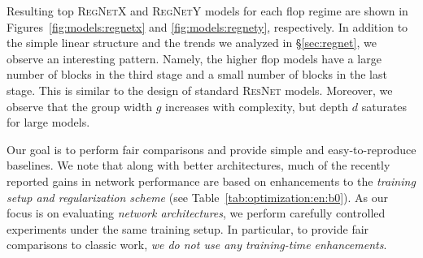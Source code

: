 \documentclass[10pt,twocolumn,letterpaper]{article}
\newcommand{\model}[1]{\textsc{\small#1}}
\begin{document}
Resulting top \model{RegNetX} and \model{RegNetY} models for each flop regime are shown in Figures~\ref{fig:models:regnetx} and \ref{fig:models:regnety}, respectively. In addition to the simple linear structure and the trends we analyzed in \S\ref{sec:regnet}, we observe an interesting pattern. Namely, the higher flop models have a large number of blocks in the third stage and a small number of blocks in the last stage. This is similar to the design of standard \model{ResNet} models. Moreover, we observe that the group width $g$ increases with complexity, but depth $d$ saturates for large models.

Our goal is to perform fair comparisons and provide simple and easy-to-reproduce baselines. We note that along with better architectures, much of the recently reported gains in network performance are based on enhancements to the \emph{training setup and regularization scheme} (see Table~\ref{tab:optimization:en:b0}). As our focus is on evaluating \emph{network architectures}, we perform carefully controlled experiments under the same training setup. In particular, to provide fair comparisons to classic work, \emph{we do not use any training-time enhancements}.
\end{document}

